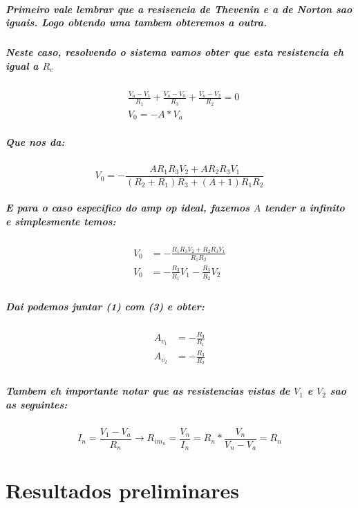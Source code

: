 \documentclass[12pt,twoside, a4paper, twocolumn]{article}
\begin{document}
\subparagraph*{Primeiro vale lembrar que a resisencia de Thevenin e a de Norton sao iguais. Logo obtendo uma tambem obteremos a outra.
}

\subparagraph*{Neste caso, resolvendo o sistema vamos obter que esta resistencia eh igual a $R_{c}$}

\begin{equation}
    \begin{aligned}
         & \frac{V_a - V_1}{R_1} + \frac{V_a-V_0}{R_3} + \frac{V_a-V_2}{R_2} = 0 \\
         & V_0 = -A*V_a
    \end{aligned}
\end{equation}

\subparagraph*{Que nos da:}

\begin{equation}
    V_0 = -\frac{A R_1 R_3 V_2 + A R_2 R_3 V_1}{(R_2 + R_1)R_3 + (A + 1) R_1 R_2}
\end{equation}

\subparagraph*{E para o caso especifico do amp op ideal, fazemos $A$ tender a infinito e simplesmente temos:}

\begin{equation}
    \begin{aligned}
        V_0 & = -\frac{R_1 R_3 V_2 + R_2 R_3 V_1}{R_1 R_2} \\
        V_0 & = - \frac{R_3}{R_1}V_1 - \frac{R_3}{R_2}V_2  \\
    \end{aligned}
\end{equation}

\subparagraph*{Dai podemos juntar (1) com (3) e obter:}

\begin{equation}
    \begin{aligned}
        A_{v_1} & = -\frac{R_3}{R_1} \\
        A_{v_2} & = -\frac{R_3}{R_2} \\
    \end{aligned}
\end{equation}


\subparagraph*{Tambem eh importante notar que as resistencias vistas de $V_1$ e $V_2$ sao as seguintes:}
\begin{equation}
    I_n = \frac{V_1-V_a}{R_n} \rightarrow R_{im_n} = \frac
    {V_n}{I_n} = R_n * \frac{V_n}{V_n - V_a} = R_n
\end{equation}

\section{Resultados preliminares}
\end{document}
